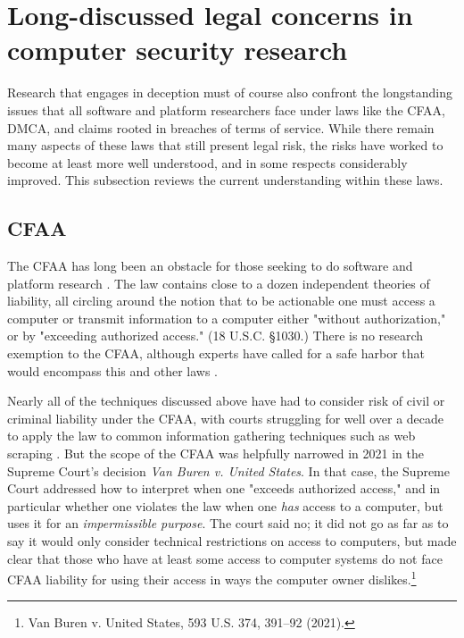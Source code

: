 \section{Long-discussed legal concerns in computer security research}
\label{sec:cfaa-dmca}

Research that engages in deception must of course also confront the longstanding issues that all software and platform researchers face under laws like the CFAA, DMCA, and claims rooted in breaches of terms of service. While there remain many aspects of these laws that still present legal risk, the risks have worked to become at least more well understood, and in some respects considerably improved. This subsection reviews the current understanding within these laws.

\subsection{CFAA}
The CFAA has long been an obstacle for those seeking to do software and platform research \cite{parkResearchersGuideLegal, baranetsky2018}. The law contains close to a dozen independent theories of liability, all circling around the notion that to be actionable one must access a computer or transmit information to a computer either "without authorization," or by "exceeding authorized access." (18 U.S.C. §1030.) There is no research exemption to the CFAA, \cite{calo2018} although experts have called for a safe harbor that would encompass this and other laws \cite{abdo_safe_2022, longpre_safe_2024}.

Nearly all of the techniques discussed above have had to consider risk of civil or criminal liability under the CFAA, with courts struggling for well over a decade to apply the law to common information gathering techniques such as web scraping \cite{sellars2018}. But the scope of the CFAA was helpfully narrowed in 2021 in the Supreme Court's decision \textit{Van Buren v. United States}. In that case, the Supreme Court addressed how to interpret when one "exceeds authorized access," and in particular whether one violates the law when one \textit{has} access to a computer, but uses it for an \textit{impermissible purpose}. The court said no; it did not go as far as to say it would only consider technical restrictions on access to computers, but made clear that those who have at least some access to computer systems do not face CFAA liability for using their access in ways the computer owner dislikes.\footnote{Van Buren v. United States, 593 U.S. 374, 391–92 (2021).} 

